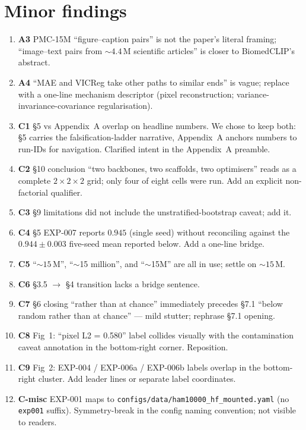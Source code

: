 \documentclass[11pt,a4paper]{article}
\begin{document}
\section{Minor findings}

\begin{enumerate}[leftmargin=2em]
\item \textbf{A3} PMC-15M ``figure--caption pairs'' is not the paper's literal
      framing; ``image--text pairs from $\sim$$4.4$\,M scientific articles''
      is closer to BiomedCLIP's abstract.
\item \textbf{A4} ``MAE and VICReg take other paths to similar ends'' is
      vague; replace with a one-line mechanism descriptor (pixel
      reconstruction; variance-invariance-covariance regularisation).
\item \textbf{C1} \S5 vs Appendix~A overlap on headline numbers. We chose to
      keep both: \S5 carries the falsification-ladder narrative, Appendix~A
      anchors numbers to run-IDs for navigation. Clarified intent in the
      Appendix~A preamble.
\item \textbf{C2} \S10 conclusion ``two backbones, two scaffolds, two
      optimisers'' reads as a complete $2{\times}2{\times}2$ grid; only four
      of eight cells were run. Add an explicit non-factorial qualifier.
\item \textbf{C3} \S9 limitations did not include the unstratified-bootstrap
      caveat; add it.
\item \textbf{C4} \S5 EXP-007 reports $0.945$ (single seed) without
      reconciling against the $0.944 \pm 0.003$ five-seed mean reported
      below. Add a one-line bridge.
\item \textbf{C5} ``$\sim$$15$\,M'', ``$\sim$15 million'', and ``$\sim$15M''
      are all in use; settle on $\sim$$15$\,M.
\item \textbf{C6} \S3.5 $\to$ \S4 transition lacks a bridge sentence.
\item \textbf{C7} \S6 closing ``rather than at chance'' immediately
      precedes \S7.1 ``below random rather than at chance'' --- mild
      stutter; rephrase \S7.1 opening.
\item \textbf{C8} Fig~1: ``pixel L2 = 0.580'' label collides visually with
      the contamination caveat annotation in the bottom-right corner.
      Reposition.
\item \textbf{C9} Fig~2: EXP-004 / EXP-006a / EXP-006b labels overlap in the
      bottom-right cluster. Add leader lines or separate label coordinates.
\item \textbf{C-misc} EXP-001 maps to
      \texttt{configs/data/ham10000\_hf\_mounted.yaml} (no \texttt{exp001}
      suffix). Symmetry-break in the config naming convention; not visible
      to readers.
\end{enumerate}
\end{document}

